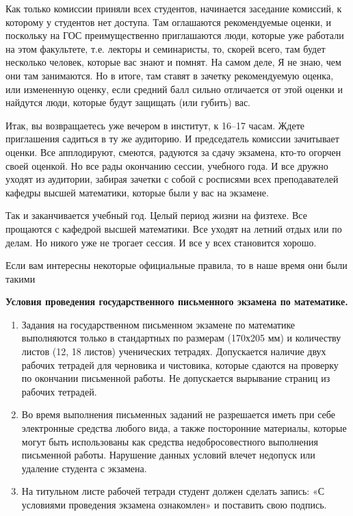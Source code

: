 Как только комиссии приняли всех студентов, начинается заседание комиссий, к которому у студентов нет доступа. Там оглашаются рекомендуемые оценки, и поскольку на ГОС преимущественно приглашаются люди, которые уже работали на этом факультете, т.е. лекторы и семинаристы, то, скорей всего, там будет несколько человек, которые вас знают и помнят. На самом деле, Я не знаю, чем они там занимаются. Но в итоге, там ставят в зачетку рекомендуемую оценка, или измененную оценку, если средний балл сильно отличается от этой оценки и найдутся люди, которые будут защищать (или губить) вас.

Итак, вы возвращаетесь уже вечером в институт, к 16--17 часам. Ждете приглашения садиться в ту же аудиторию. И председатель комиссии зачитывает оценки. Все апплодируют, смеются, радуются за сдачу экзамена, кто-то огорчен своей оценкой. Но все рады окончанию сессии, учебного года. И все дружно уходят из аудитории, забирая зачетки с собой с росписями всех преподавателей кафедры высшей математики, которые были у вас на экзамене.

Так и заканчивается учебный год. Целый период жизни на физтехе. Все прощаются с кафедрой высшей математики. Все уходят на летний отдых или по делам. Но никого уже не трогает сессия. И все у всех становится хорошо. 



\newpage
Если вам интересны некоторые официальные правила, то в наше время они были такими

\textbf{Условия проведения государственного письменного экзамена по математике.}

\begin{enumerate}
\item Задания на государственном письменном экзамене по математике выполняются только в
стандартных по размерам (170х205 мм) и количеству листов (12, 18 листов) ученических тетрадях.
Допускается наличие двух рабочих тетрадей для черновика и чистовика, которые сдаются на
проверку по окончании письменной работы. Не допускается вырывание страниц из рабочих
тетрадей.
\item Во время выполнения письменных заданий не разрешается иметь при себе электронные
средства любого вида, а также посторонние материалы, которые могут быть использованы как
средства недобросовестного выполнения письменной работы.
Нарушение данных условий влечет недопуск или удаление студента с экзамена.
\item На титульном листе рабочей тетради студент должен сделать запись:
«С условиями проведения экзамена ознакомлен» и поставить свою подпись.
\end{enumerate}